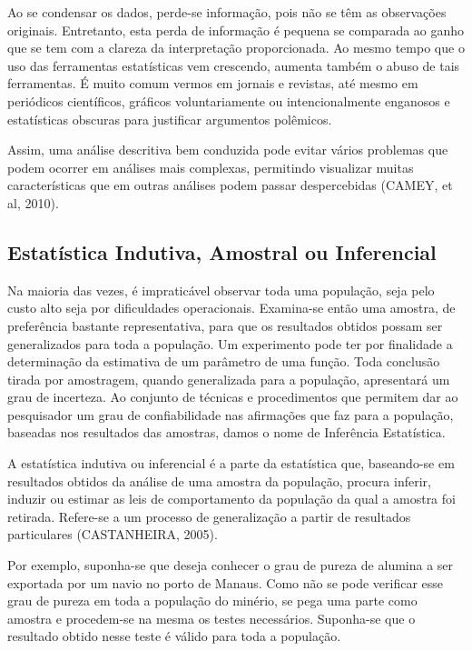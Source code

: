  Ao se condensar os dados, perde-se informação, pois não se têm as observações originais. Entretanto, esta perda de informação é pequena se comparada ao ganho que se tem com a clareza da interpretação proporcionada. Ao mesmo tempo que o uso das ferramentas estatísticas vem crescendo, aumenta também o abuso de tais ferramentas. É muito comum vermos em jornais e revistas, até mesmo em periódicos científicos, gráficos voluntariamente ou intencionalmente enganosos e estatísticas obscuras para justificar argumentos polêmicos.\vskip0.3cm


Assim, uma análise descritiva bem conduzida pode evitar vários problemas que podem ocorrer em análises mais complexas, permitindo  visualizar  muitas  características que  em  outras  análises  podem  passar  despercebidas (CAMEY, et al, 2010).






\subsection{Estatística Indutiva, Amostral ou Inferencial}

\inic Na  maioria das vezes, é impraticável observar toda uma população, seja pelo custo alto seja por dificuldades operacionais. Examina-se então uma amostra, de preferência bastante representativa, para que os resultados obtidos possam ser generalizados para toda a população. Um experimento pode ter por finalidade a determinação da estimativa de um parâmetro de uma função. Toda conclusão tirada por amostragem, quando generalizada para a população, apresentará um grau de incerteza. Ao conjunto de técnicas e procedimentos que permitem dar ao pesquisador um grau de confiabilidade nas afirmações que faz para a população, baseadas nos resultados das amostras, damos o nome de Inferência Estatística.\vskip0.3cm

A estatística indutiva ou inferencial é a parte da estatística que, baseando-se em resultados obtidos da análise de uma amostra da população, procura inferir, induzir ou estimar as leis de comportamento da população da qual a amostra foi retirada. Refere-se a um processo de generalização a partir de resultados particulares (CASTANHEIRA, 2005).\vskip0.3cm


Por exemplo, suponha-se que deseja conhecer o grau de pureza de alumina a ser exportada por um navio no porto de Manaus. Como não se pode verificar esse grau de pureza em toda a população do minério, se pega uma parte como amostra e procedem-se na mesma os testes necessários. Suponha-se que o resultado obtido nesse teste é válido para toda a população.\vskip0.3cm

